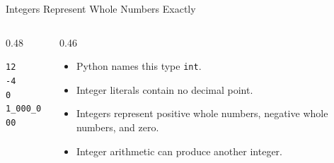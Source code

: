 \documentclass[aspectratio=169,10pt]{beamer}
\begin{document}

\begin{frame}{Integers Represent Whole Numbers Exactly}

  \begin{columns}[T,onlytextwidth]

    \begin{column}{0.48\textwidth}

      \begin{center}

        {\Large \texttt{12}}\\[0.12in]
        {\Large \texttt{-4}}\\[0.12in]
        {\Large \texttt{0}}\\[0.12in]
        {\Large \texttt{1\_000\_000}}

      \end{center}

    \end{column}

    \begin{column}{0.46\textwidth}

      \begin{itemize}

        \item Python names this type \texttt{int}.

        \item Integer literals contain no decimal point.

        \item Integers represent positive whole numbers, negative whole numbers, and zero.

        \item Integer arithmetic can produce another integer.

      \end{itemize}

    \end{column}

  \end{columns}


\end{frame}
\end{document}
